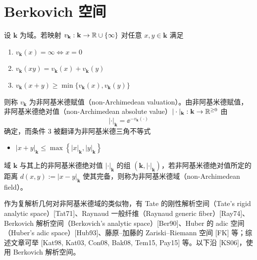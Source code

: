 \section{Berkovich 空间}


设 $\mathbf{k}$ 为域。若映射 $v_{\mathbf{k}} : \mathbf{k} \to \mathbb{R} \cup \{\infty\}$ 对任意 $x, y \in \mathbf{k}$ 满足
\begin{enumerate}[label=\arabic*.]
\item $v_{\mathbf{k}}(x) = \infty \Leftrightarrow x = 0$
\item $v_{\mathbf{k}}(xy) = v_{\mathbf{k}}(x) + v_{\mathbf{k}}(y)$
\item $v_{\mathbf{k}}(x+y) \ge \min\{v_{\mathbf{k}}(x), v_{\mathbf{k}}(y)\}$
\end{enumerate}
则称 $v_{\mathbf{k}}$ 为非阿基米德赋值（non-Archimedean valuation）。由非阿基米德赋值，非阿基米德绝对值（non-Archimedean absolute value）$|\cdot|_{\mathbf{k}} : \mathbf{k} \to \mathbb{R}^{\ge 0}$ 由
\begin{equation}
|\cdot|_{\mathbf{k}} = \ee^{-v_{\mathbf{k}}(\cdot)} \tag{33.1}
\end{equation}
确定，而条件 3 被翻译为非阿基米德三角不等式
\begin{itemize}
\item $|x+y|_{\mathbf{k}} \le \max\left\{|x|_{\mathbf{k}}, |y|_{\mathbf{k}}\right\}$
\end{itemize}
域 $\mathbf{k}$ 与其上的非阿基米德绝对值 $|\cdot|_{\mathbf{k}}$ 的组 $(\mathbf{k}, |\cdot|_{\mathbf{k}})$，若非阿基米德绝对值所定的距离 $d(x,y) := |x-y|_{\mathbf{k}}$ 使其完备，则称为非阿基米德域（non-Archimedean field）。

作为复解析几何对非阿基米德域的类似物，有 Tate 的刚性解析空间（Tate's rigid analytic space）[Tat71]、Raynaud 一般纤维（Raynaud generic fiber）[Ray74]、Berkovich 解析空间（Berkovich's analytic space）[Ber90]、Huber 的 adic 空间（Huber's adic space）[Hub93]、藤原--加藤的 Zariski--Riemann 空间 [FK] 等；综述文章可举 [Kat98, Kat03, Con08, Bak08, Tem15, Pay15] 等。以下沿 [KS06]，使用 Berkovich 解析空间。

